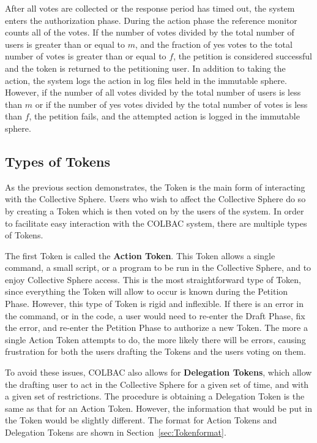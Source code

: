 After all votes are collected or the response period has timed out, the system
enters the authorization phase. During the action phase the reference monitor
counts all of the votes. If the number of votes divided by the total number of
users is greater than or equal to $m$, and the fraction of yes votes to the
total number of votes is greater than or equal to $f$, the petition is
considered successful and the token is returned to the petitioning user. In
addition to taking the action, the system logs the action in log files held in
the immutable sphere. However, if the number of all votes divided by the total
number of users is less than $m$ or if the number of yes votes divided by the
total number of votes is less than $f$, the petition fails, and the attempted
action is logged in the immutable sphere.

\subsection{Types of Tokens}
\label{sec:Tokentypes}
As the previous section demonstrates, the Token is the main form of interacting
with the Collective Sphere. Users who wish to affect the Collective Sphere do
so by creating a Token which is then voted on by the users of the system. In
order to facilitate easy interaction with the COLBAC system, there are multiple
types of Tokens.

The first Token is called the \textbf{Action Token}. This Token allows a single
command, a small script, or a program to be run in the Collective Sphere, and to
enjoy Collective Sphere access. This is the most straightforward type of Token,
since everything the Token will allow to occur is known during the Petition
Phase. However, this type of Token is rigid and inflexible. If there is an error
in the command, or in the code, a user would need to re-enter the Draft Phase,
fix the error, and re-enter the Petition Phase to authorize a new Token. The
more a single Action Token attempts to do, the more likely there will be errors,
causing frustration for both the users drafting the Tokens and the users voting
on them.

To avoid these issues, COLBAC also allows for \textbf{Delegation Tokens}, which
allow the drafting user to act in the Collective Sphere for a given set of time,
and with a given set of restrictions. The procedure is obtaining a Delegation
Token is the same as that for an Action Token. However, the information that
would be put in the Token would be slightly different. The format for Action
Tokens and Delegation Tokens are shown in Section~\ref{sec:Tokenformat}.

